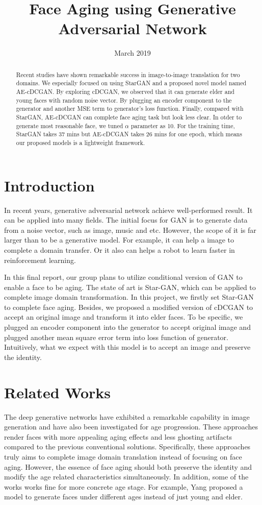 \documentclass{article}
\title{Face Aging using Generative Adversarial Network}
\date{March 2019}
\begin{document}
\maketitle
\begin{abstract}
Recent studies have shown remarkable success in image-to-image translation for two domains. We especially focused on using StarGAN and a proposed novel model named AE-cDCGAN. By exploring cDCGAN, we observed that it can generate elder and young faces with random noise vector. By plugging an encoder component to the generator and another MSE term to generator's loss function. Finally, compared with StarGAN, AE-cDCGAN can complete face aging task but look less clear. In otder to generate most reasonable face, we tuned $\alpha$ parameter as 10. For the training time, StarGAN takes 37 mins but AE-cDCGAN takes 26 mins for one epoch, which means our proposed models is a lightweight framework.
\end{abstract}

\section{Introduction}
In recent years, generative adversarial network achieve well-performed result. It can be applied into many fields. The initial focus for GAN is to generate data from a noise vector, such as image, music and etc. However, the scope of it is far larger than to be a generative model. For example, it can help a image to complete a domain transfer. Or it also can helps a robot to learn faster in reinforcement learning. 
\par In this final report, our group plans to utilize conditional version of GAN to enable a face to be aging. The state of art is Star-GAN, which can be applied to complete image domain transformation. In this project, we firstly set Star-GAN\cite{DBLP:journals/corr/abs-1711-09020} to complete face aging. Besides, we proposed a modified version of cDCGAN to accept an original image and transform it into elder faces. To be specific, we plugged an encoder component into the generator to accept original image and plugged another mean square error term into loss function of generator. Intuitively, what we expect with this model is to accept an image and preserve the identity.

\section{Related Works}
The deep generative networks have exhibited a remarkable capability in image generation and have also been investigated for age progression. These approaches render faces with more appealing aging effects and less ghosting artifacts compared to the previous conventional solutions. Specifically, these approaches truly aims to complete image domain translation instead of focusing on face aging. However, the essence of face aging should both preserve the identity and modify the age related characteristics simultaneously. In addition, some of the works works fine for more concrete age stage. For example, Yang\cite{Yang2017Learning} proposed a model to generate faces under different ages instead of just young and elder. 
\end{document}
